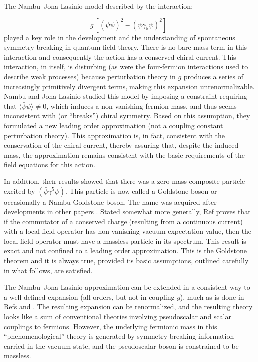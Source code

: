 \documentclass[12pt]{article}
\begin{document}
  The Nambu--Jona-Lasinio model \cite{Nambu:1961tp,Nambu;1961tp2}
  described by the interaction:

  \begin{equation*}
    g\, \left[ (\bar{\psi}\psi)^2 - (\bar{\psi}\gamma_{5}\psi)^2 \right] \; 
  \end{equation*}
  played a key role in the development and the understanding of spontaneous
  symmetry breaking in quantum field theory.  There is no bare mass term in
  this interaction and consequently the action has a conserved chiral
  current. This interaction, in itself, is disturbing (as were the
  four-fermion interactions used to describe weak processes) because
  perturbation theory in $g$ produces a series of increasingly primitively
  divergent terms, making this expansion unrenormalizable. Nambu and
  Jona-Lasinio studied this model by imposing a constraint requiring that
  $\langle\bar{\psi}\psi\rangle \neq 0$, which induces a non-vanishing fermion
  mass, and thus seems inconsistent with (or ``breaks'') chiral
  symmetry. Based on this assumption, they formulated a new leading order
  approximation (not a coupling constant perturbation theory). This
  approximation is, in fact, consistent with the conservation of the chiral
  current, thereby assuring that, despite the induced mass, the approximation
  remains consistent with the basic requirements of the field equations for
  this action.

  In addition, their results showed that there was a zero mass composite
  particle excited by $(\bar{\psi}\gamma^5\psi)$. This particle is now called
  a Goldstone boson or occasionally a Nambu-Goldstone boson. The name was
  acquired after developments in other papers \cite{jg;1961,gsw;1962}. Stated
  somewhat more generally, Ref \cite{gsw;1962} proves that if the commutator
  of a conserved charge (resulting from a continuous current) with a local
  field operator has non-vanishing vacuum expectation value, then the local
  field operator must have a massless particle in its spectrum. This result is
  exact and not confined to a leading order approximation. This is the
  Goldstone theorem and it is always true, provided its basic assumptions,
  outlined carefully in what follows, are satisfied.

  The Nambu--Jona-Lasinio approximation can be extended in a consistent way to a well
  defined expansion (all orders, but not in coupling $g$), much as is done in
  Refs \cite{ggff1;194} and \cite{ggff2;1964}. The resulting expansion can
  be renormalized, and the resulting theory looks like a sum of conventional
  theories involving pseudoscalar and scalar couplings to fermions. However,
  the underlying fermionic mass in this  ``phenomenological'' theory is
  generated by symmetry breaking information carried in the vacuum state, and the
  pseudoscalar boson is constrained to be massless.
\end{document}

